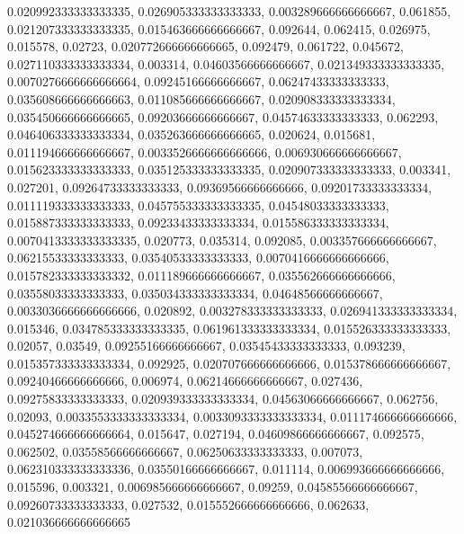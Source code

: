 0.020992333333333335, 0.026905333333333333, 0.003289666666666667, 0.061855, 0.021207333333333335, 0.015463666666666667, 0.092644, 0.062415, 0.026975, 0.015578, 0.02723, 0.020772666666666665, 0.092479, 0.061722, 0.045672, 0.027110333333333334, 0.003314, 0.04603566666666667, 0.021349333333333335, 0.0070276666666666664, 0.09245166666666667, 0.06247433333333333, 0.035608666666666663, 0.011085666666666667, 0.020908333333333334, 0.035450666666666665, 0.09203666666666667, 0.04574633333333333, 0.062293, 0.046406333333333334, 0.035263666666666665, 0.020624, 0.015681, 0.011194666666666667, 0.0033526666666666666, 0.006930666666666667, 0.015623333333333333, 0.035125333333333335, 0.020907333333333333, 0.003341, 0.027201, 0.09264733333333333, 0.09369566666666666, 0.09201733333333334, 0.011119333333333333, 0.045755333333333335, 0.04548033333333333, 0.015887333333333333, 0.09233433333333334, 0.015586333333333334, 0.0070413333333333335, 0.020773, 0.035314, 0.092085, 0.003357666666666667, 0.06215533333333333, 0.03540533333333333, 0.0070416666666666666, 0.015782333333333332, 0.011189666666666667, 0.035562666666666666, 0.03558033333333333, 0.035034333333333334, 0.04648566666666667, 0.0033036666666666666, 0.020892, 0.003278333333333333, 0.026941333333333334, 0.015346, 0.034785333333333335, 0.061961333333333334, 0.015526333333333333, 0.02057, 0.03549, 0.09255166666666667, 0.03545433333333333, 0.093239, 0.015357333333333334, 0.092925, 0.020707666666666666, 0.015378666666666667, 0.09240466666666666, 0.006974, 0.06214666666666667, 0.027436, 0.09275833333333333, 0.020939333333333334, 0.04563066666666667, 0.062756, 0.02093, 0.0033553333333333334, 0.0033093333333333334, 0.011174666666666666, 0.045274666666666664, 0.015647, 0.027194, 0.04609866666666667, 0.092575, 0.062502, 0.03558566666666667, 0.06250633333333333, 0.007073, 0.062310333333333336, 0.03550166666666667, 0.011114, 0.006993666666666666, 0.015596, 0.003321, 0.006985666666666667, 0.09259, 0.04585566666666667, 0.09260733333333333, 0.027532, 0.015552666666666666, 0.062633, 0.021036666666666665